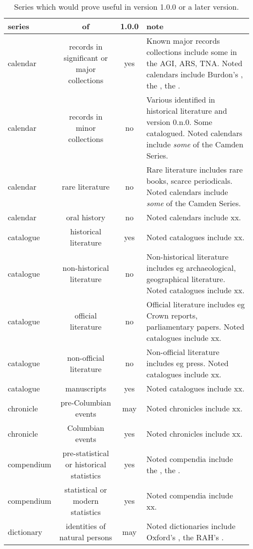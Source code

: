 \begin{table}[h]%
\caption{Series which would prove useful in version 1.0.0 or a later version.}%
\label{t:series}%
\begin{tabularx}{\textwidth}{lScL}
\toprule
series & of & 1.0.0 & note\\
\midrule
calendar & records in significant or major collections & yes & Known major records collections include some in the AGI, ARS, TNA. Noted calendars include Burdon's , the , the .\\
calendar & records in minor collections & no & Various identified in historical literature and version 0.n.0. Some catalogued. Noted calendars include \emph{some} of the Camden Series.\\
calendar & rare literature & no & Rare literature includes rare books, scarce periodicals. Noted calendars include \emph{some} of the Camden Series.\\
calendar & oral history & no & Noted calendars include xx.\\
catalogue & historical literature & yes & Noted catalogues include xx.\\
catalogue & non-historical literature & no & Non-historical literature includes eg archaeological, geographical literature. Noted catalogues include xx.\\
catalogue & official literature & no & Official literature includes eg Crown reports, parliamentary papers. Noted catalogues include xx.\\
catalogue & non-official literature & no & Non-official literature includes eg press. Noted catalogues include xx.\\
catalogue & manuscripts & yes & Noted catalogues include xx.\\
chronicle & pre-Columbian events & may & Noted chronicles include xx.\\
chronicle & Columbian events & yes & Noted chronicles include xx.\\
compendium & pre-statistical or historical statistics & yes & Noted compendia include the , the .\\
compendium & statistical or modern statistics & yes & Noted compendia include xx.%
\\
dictionary & identities of natural persons & may & Noted dictionaries include Oxford's , the RAH's .\\

\end{tabularx}
\end{table}
